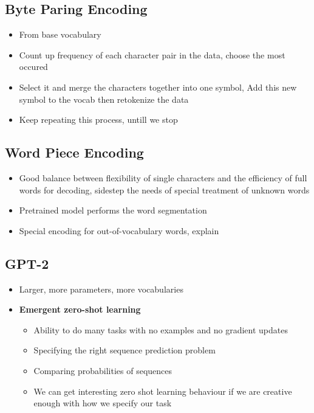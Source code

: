 \subsection{Byte Paring Encoding}
\begin{itemize}
    \item From base vocabulary
    \item Count up frequency of each character pair in the data, choose the most occured
    \item Select it and merge the characters together into one symbol, Add this new symbol to the vocab then retokenize the data
    \item Keep repeating this process, untill we stop
\end{itemize}
\subsection{Word Piece Encoding}
\begin{itemize}
    \item Good balance between flexibility of single characters and the efficiency of full words for decoding, sidestep the needs of special treatment of unknown words
    \item Pretrained model performs the word segmentation
    \item Special encoding for out-of-vocabulary words, explain
\end{itemize}
\subsection{GPT-2}
\begin{itemize}
    \item Larger, more parameters, more vocabularies
    \item \textbf{Emergent zero-shot learning}
    \begin{itemize}
        \item Ability to do many tasks with no examples and no gradient updates
        \item Specifying the right sequence prediction problem
        \item Comparing probabilities of sequences
        \item We can get interesting zero shot learning behaviour if we are creative enough with how we specify our task
    \end{itemize}
\end{itemize}
